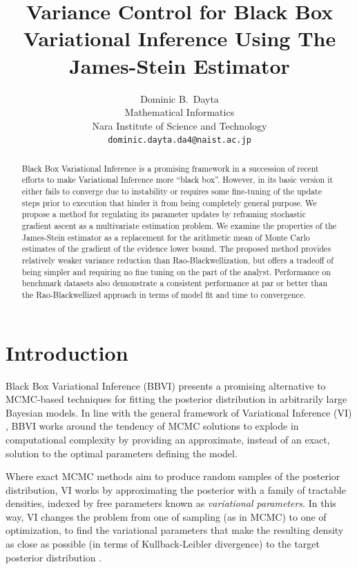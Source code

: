 \documentclass{article}
\title{Variance Control for Black Box Variational Inference Using The James-Stein Estimator}
\author{%
  Dominic B.~Dayta \\
  Mathematical Informatics\\
  Nara Institute of Science and Technology\\
  \texttt{dominic.dayta.da4@naist.ac.jp} \\
}
\begin{document}
\maketitle

\begin{abstract}
Black Box Variational Inference is a promising framework in a succession of recent efforts to make Variational Inference more ``black box''. However, in its basic version it either fails to converge due to instability or requires some fine-tuning of the update steps prior to execution that hinder it from being completely general purpose. We propose a method for regulating its parameter updates by reframing stochastic gradient ascent as a multivariate estimation problem. We examine the properties of the James-Stein estimator as a replacement for the arithmetic mean of Monte Carlo estimates of the gradient of the evidence lower bound. The proposed method provides relatively weaker variance reduction than Rao-Blackwellization, but offers a tradeoff of being simpler and requiring no fine tuning on the part of the analyst. Performance on benchmark datasets also demonstrate a consistent performance at par or better than the Rao-Blackwellized approach in terms of model fit and time to convergence.
\end{abstract}


\section{Introduction}

Black Box Variational Inference (BBVI) \cite{Ranganath-2014} presents a promising alternative to MCMC-based techniques for fitting the posterior distribution in arbitrarily large Bayesian models. In line with the general framework of Variational Inference (VI) \cite{Blei-2017}, BBVI works around the tendency of MCMC solutions to explode in computational complexity by providing an approximate, instead of an exact, solution to the optimal parameters defining the model.

Where exact MCMC methods aim to produce random samples of the posterior distribution, VI works by approximating the posterior with a family of tractable densities, indexed by free parameters known as \textit{variational parameters}. In this way, VI changes the problem from one of sampling (as in MCMC) to one of optimization, to find the variational parameters that make the resulting density as close as possible (in terms of Kullback-Leibler divergence) to the target posterior distribution \cite{Blei-2017}.
\end{document}
